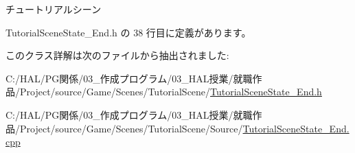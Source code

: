 チュートリアルシーン 



 Tutorial\+Scene\+State\+\_\+\+End.\+h の 38 行目に定義があります。



このクラス詳解は次のファイルから抽出されました\+:\begin{DoxyCompactItemize}
\item 
C\+:/\+H\+A\+L/\+P\+G関係/03\+\_\+作成プログラム/03\+\_\+\+H\+A\+L授業/就職作品/\+Project/source/\+Game/\+Scenes/\+Tutorial\+Scene/\mbox{\hyperlink{_tutorial_scene_state___end_8h}{Tutorial\+Scene\+State\+\_\+\+End.\+h}}\item 
C\+:/\+H\+A\+L/\+P\+G関係/03\+\_\+作成プログラム/03\+\_\+\+H\+A\+L授業/就職作品/\+Project/source/\+Game/\+Scenes/\+Tutorial\+Scene/\+Source/\mbox{\hyperlink{_tutorial_scene_state___end_8cpp}{Tutorial\+Scene\+State\+\_\+\+End.\+cpp}}\end{DoxyCompactItemize}

